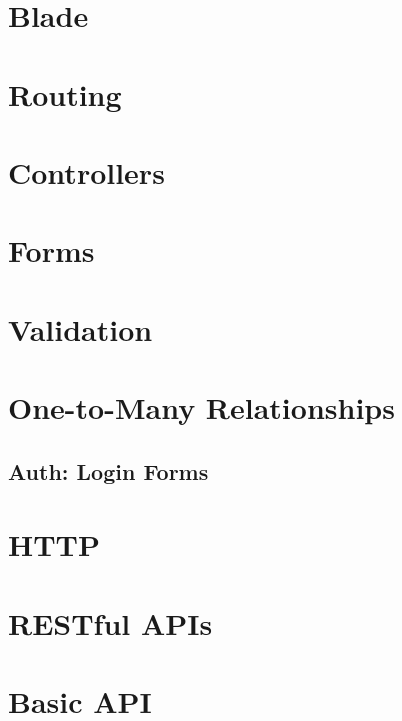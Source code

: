 \documentclass[b5paper,openany]{book}
\begin{document}
\chapter{Blade}


\chapter{Routing}


\chapter{Controllers}


\chapter{Forms}


\chapter{Validation}


\chapter{One-to-Many Relationships}


\begin{readonly}
    \chapter{Auth: Login Forms}
    
\end{readonly}

\chapter{HTTP}


\chapter{RESTful APIs}


\chapter{Basic API}

\end{document}
